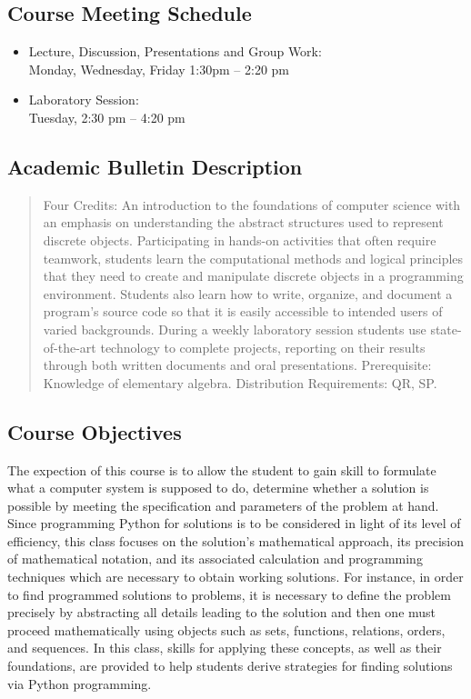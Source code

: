 \documentclass[11pt]{article} %
\begin{document}
\subsection*{\textbf{Course Meeting Schedule}}
\begin{itemize}
    \item Lecture, Discussion, Presentations and Group Work:\\
        \indent Monday, Wednesday, Friday 1:30pm -- 2:20 pm 
    \item Laboratory Session:\\
        \indent Tuesday, 2:30 pm -- 4:20 pm \\
\end{itemize}


\subsection*{Academic Bulletin Description}

\begin{quote}
Four Credits: An introduction to the foundations of computer science with an emphasis on understanding the abstract structures used to represent discrete objects. Participating in hands-on activities that often require teamwork, students learn the computational methods and logical principles that they need to create and manipulate discrete objects in a programming environment. Students also learn how to write, organize, and document a program’s source code so that it is easily accessible to intended users of varied backgrounds. During a weekly laboratory session students use state-of-the-art technology to complete projects, reporting on their results through both written documents and oral presentations.
Prerequisite: Knowledge of elementary algebra. Distribution Requirements: QR, SP.

\end{quote}

\subsection*{Course Objectives}
The expection of this course is to allow the student to gain skill to formulate what a computer system is supposed to do, determine whether a solution is possible by meeting the specification and parameters of the problem at hand. Since programming Python for solutions is to be considered in light of its level of efficiency, this class focuses on the solution's mathematical approach, its precision of mathematical notation, and its associated calculation and programming techniques which are necessary to obtain working solutions. For instance, in order to find programmed solutions to problems, it is necessary to define the problem precisely by abstracting all details leading to the solution and then one must proceed mathematically using objects such as sets, functions, relations, orders, and sequences. In this class, skills for applying these concepts, as well as their foundations, are provided to help students derive strategies for finding solutions via Python programming. 
\end{document}
